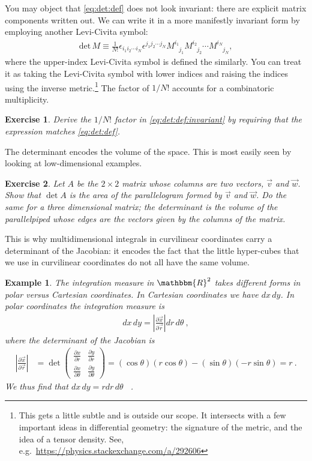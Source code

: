 \documentclass[
  11pt,
	colorful,
	raggedright,
]{tufte-style-thesis-flip}
\newtheorem{exercise}{Exercise}[section]
\newtheorem{example}{Example}[section]
\newcommand{\aij}[2]{^{#1}_{\phantom{#1}#2}}
\begin{document}
You may object that \eqref{eq:det:def} does not look invariant: there are explicit matrix components written out. We can write it in a more manifestly invariant form by employing another Levi-Civita symbol:
\begin{align}
  \text{det}\,M \equiv 
  \frac{1}{N!}
  \epsilon_{i_1i_2\cdots i_N} 
  \epsilon^{j_1j_2\cdots j_N} 
    M\aij{i_1}{j_1} M\aij{i_2}{j_2}\cdots M\aij{i_N}{j_N} ,
    \label{eq:det:def:invariant}
\end{align}
where the upper-index Levi-Civita symbol is defined the similarly. You can treat it as taking the Levi-Civita symbol with lower indices and raising the indices using the inverse metric.\footnote{This gets a little subtle and is outside our scope. It intersects with a few important ideas in differential geometry: the signature of the metric, and the idea of a tensor density. See, e.g.~\url{https://physics.stackexchange.com/a/292606}} The factor of $1/N!$ accounts for a combinatoric multiplicity.
\begin{exercise}
Derive the $1/N!$ factor in \eqref{eq:det:def:invariant} by requiring that the expression matches \eqref{eq:det:def}.
\end{exercise}

The determinant encodes the volume of the space. This is most easily seen by looking at low-dimensional examples. 
\begin{exercise}
Let $A$ be the $2\times 2$ matrix whose columns are two vectors, $\vec{v}$ and $\vec{w}$. Show that $\det A$ is the area of the parallelogram formed by $\vec{v}$ and $\vec{w}$. Do the same for a three dimensional matrix; the determinant is the volume of the parallelpiped whose edges are the vectors given by the columns of the matrix.
\end{exercise}
This is why multidimensional integrals in curvilinear coordinates carry a determinant of the Jacobian: it encodes the fact that the little hyper-cubes that we use in curvilinear coordinates do not all have the same volume. 
\begin{example}
The integration measure in $\mathbbm{R}^2$ takes different forms in polar versus Cartesian coordinates. In Cartesian coordinates we have $dx\,dy$. In polar coordinates the integration measure is
\begin{align}
  dx\,dy = \left|\frac{\partial \vec{x}}{\partial \vec{r}} \right| dr\,d\theta \ ,
\end{align}
where the determinant of the Jacobian is
\begin{align}
  \left|\frac{\partial \vec{x}}{\partial \vec{r}} \right|
  &= 
  \det
  \begin{pmatrix}
  \frac{\partial x}{\partial r}  
  &
  \frac{\partial y}{\partial r}  
  \\
  \frac{\partial x}{\partial \theta}  
  &
  \frac{\partial y}{\partial \theta}  
  \end{pmatrix}
  =
  (\cos\theta)(r\cos\theta) - (\sin\theta)(-r\sin\theta) = r \ .
\end{align}
We thus find that $dx\,dy = rdr\,d\theta$ \ .
\end{example}
\end{document}
